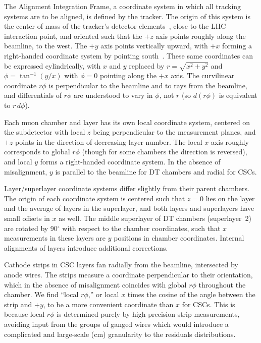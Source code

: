 The Alignment Integration Frame, a coordinate system in which all
tracking systems are to be aligned, is defined by the tracker.  The
origin of this system is the center of mass of the tracker's detector
elements~\cite{ref:tracker_alignment}, close to the LHC interaction
point, and oriented such that the $+z$ axis points roughly along the
beamline, to the west.  The $+y$ axis points vertically upward, with
$+x$ forming a right-handed coordinate system by pointing
south~\cite{ref:twikiCMSConventions}.  These same coordinates can be
expressed cylindrically, with $x$ and $y$ replaced by $r = \sqrt{x^2 +
y^2}$ and $\phi = \tan^{-1}(y/x)$ with $\phi=0$ pointing along the
$+x$ axis.  The curvilinear coordinate $r\phi$ is perpendicular to the
beamline and to rays from the beamline, and differentials of $r\phi$
are understood to vary in $\phi$, not $r$ (so $d(r\phi)$ is equivalent
to $r \, d\phi$).

Each muon chamber and layer has its own local coordinate system,
centered on the subdetector with local $z$ being perpendicular to the
measurement planes, and $+z$ points in the direction of decreasing
layer number.  The local $x$ axis roughly corresponds to global
$r\phi$ (though for some chambers the direction is reversed), and
local $y$ forms a right-handed coordinate system.  In the absence of
misalignment, $y$ is parallel to the beamline for DT chambers and
radial for CSCs.

Layer/superlayer coordinate systems differ slightly from their parent
chambers.  The origin of each coordinate system is centered such that
$z=0$ lies on the layer and the average of layers in the superlayer, and
both layers and superlayers have small offsets in $x$ as well.  The
middle superlayer of DT chambers (superlayer~2) are rotated by 90$^\circ$ with
respect to the chamber coordinates, such that $x$ measurements in
these layers are $y$ positions in chamber coordinates.  Internal
alignments of layers introduce additional corrections.

Cathode strips in CSC layers fan radially from the beamline,
intersected by anode wires.  The strips measure a coordinate
perpendicular to their orientation, which in the absence of
misalignment coincides with global $r\phi$ throughout the chamber.  We
find ``local $r\phi$,'' or local $x$ times the cosine of the angle
between the strip and $+y$, to be a more convenient coordinate than
$x$ for CSCs.  This is because local $r\phi$ is determined purely by
high-precision strip measurements, avoiding input from the groups of
ganged wires which would introduce a complicated and large-scale (cm)
granularity to the residuals distributions.

